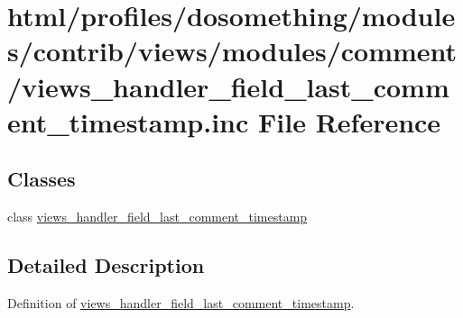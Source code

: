 \hypertarget{views__handler__field__last__comment__timestamp_8inc}{
\section{html/profiles/dosomething/modules/contrib/views/modules/comment/views\_\-handler\_\-field\_\-last\_\-comment\_\-timestamp.inc File Reference}
\label{views__handler__field__last__comment__timestamp_8inc}
}
\subsection*{Classes}
\begin{DoxyCompactItemize}
\item 
class \hyperlink{classviews__handler__field__last__comment__timestamp}{views\_\-handler\_\-field\_\-last\_\-comment\_\-timestamp}
\end{DoxyCompactItemize}


\subsection{Detailed Description}
Definition of \hyperlink{classviews__handler__field__last__comment__timestamp}{views\_\-handler\_\-field\_\-last\_\-comment\_\-timestamp}. 